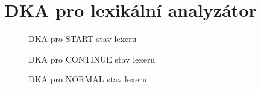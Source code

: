 \documentclass[a4paper, 11pt]{article}
\begin{document}
	\section*{DKA pro lexikální analyzátor}
	\endgroup
	\vspace{1.8cm}
	\begin{figure}[h]
		\centering
		\hspace*{-1.2cm}
		\label{lex_START}
		\caption{DKA pro START stav lexeru}
	\end{figure}
	\begin{figure}[h]
		\centering
		\hspace*{-1.2cm}
		\label{lex_CONTINUE}
		\caption{DKA pro CONTINUE stav lexeru}
	\end{figure}
	\begin{figure}[h]
		\centering
		\hspace*{-1.2cm}
		\label{lex_NORMAL}
		\caption{DKA pro NORMAL stav lexeru}
	\end{figure}
	\newpage*
	\newpage*
\end{document}
